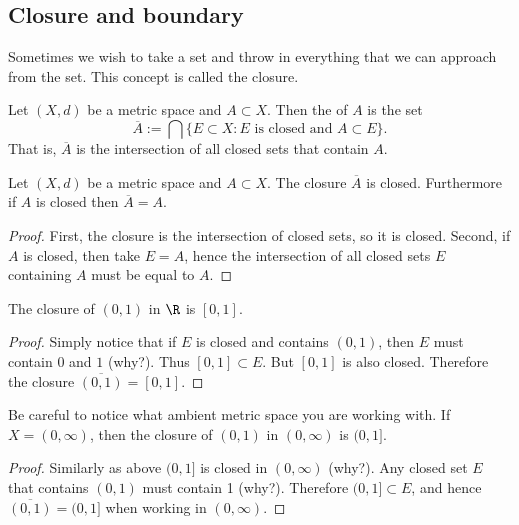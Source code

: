 \documentclass[12pt]{book}
\begin{document}
\subsection*{Closure and boundary}

Sometimes we wish to take a set and throw in everything that we can approach
from the set.
This concept is called the closure.

\begin{defn}
Let $(X,d)$ be a metric space and $A \subset X$.
Then
the \emph{} of $A$ is the set
\begin{equation*}
\overline{A} := \bigcap \{ E \subset X : \text{$E$ is closed and $A \subset
E$} \} .
\end{equation*}
That is, $\overline{A}$ is the intersection of all closed sets that contain
$A$.
\end{defn}

\begin{prop}
Let $(X,d)$ be a metric space and $A \subset X$.
The closure $\overline{A}$
is closed.
Furthermore if $A$ is closed then $\overline{A} = A$.
\end{prop}

\begin{proof}
First, the closure is the intersection of closed sets, so it is closed.
Second, if $A$ is closed, then take $E = A$, hence the intersection of all
closed sets $E$ containing $A$ must be equal to $A$.
\end{proof}

\begin{example}
The closure of $(0,1)$ in $\R$ is $[0,1]$.
\begin{proof}  Simply notice that if
$E$ is closed and contains $(0,1)$, then $E$ must contain $0$ and $1$ (why?).
Thus $[0,1] \subset E$.
But $[0,1]$ is also closed.
Therefore the closure $\overline{(0,1)} = [0,1]$.
\end{proof}
\end{example}

\begin{example}
Be careful to notice what ambient metric space you are working with.
If $X = (0,\infty)$, then
the closure of $(0,1)$ in $(0,\infty)$ is $(0,1]$.
\begin{proof}  Similarly as
above $(0,1]$ is closed in $(0,\infty)$ (why?).
Any closed set $E$
that contains $(0,1)$ must contain 1 (why?).
Therefore $(0,1] \subset E$,
and hence $\overline{(0,1)} = (0,1]$ when working in $(0,\infty)$.
\end{proof}
\end{example}
\end{document}
